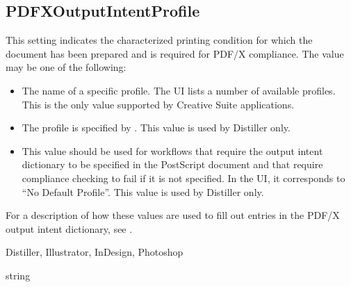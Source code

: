 \documentclass[letterpaper,12pt,english,openany,oneside]{sphinxmanual}
\begin{document}
\label{\detokenize{PDF_Create_CommonSettings:default-value-109}}

\begin{sphinxVerbatim}[commandchars=\\\{\}]
\end{sphinxVerbatim}




\subsection{PDFXOutputIntentProfile}
\label{\detokenize{PDF_Create_CommonSettings:pdfxoutputintentprofile}}
This setting indicates the characterized printing condition for which the document has been prepared and is required for PDF/X compliance. The value may be one of the following:
\begin{itemize}
\item {} 
The name of a specific profile. The UI lists a number of available profiles. This is the only value supported by Creative Suite applications.

\item {} 
 The profile is specified by  . This value is used by Distiller only.

\item {} 
 This value should be used for workflows that require the output intent dictionary to be specified in the PostScript document and that require compliance checking to fail if it is not specified. In the UI, it corresponds to “No Default Profile”. This value is used by Distiller only.

\end{itemize}

For a description of how these values are used to fill out entries in the PDF/X output intent dictionary, see .

\label{\detokenize{PDF_Create_CommonSettings:supported-by-116}}

Distiller, Illustrator, InDesign, Photoshop

\label{\detokenize{PDF_Create_CommonSettings:type-115}}

string
\end{document}
